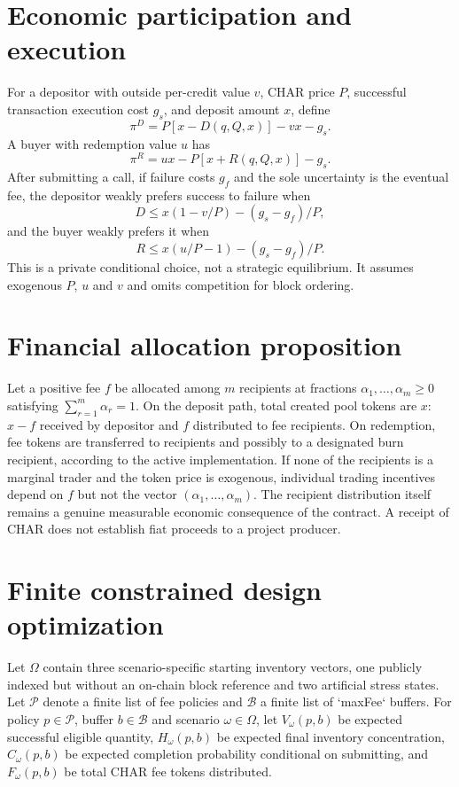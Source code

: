 \documentclass[11pt]{article}
\begin{document}
\section{Economic participation and execution}
For a depositor with outside per-credit value $v$, CHAR price $P$, successful transaction execution cost $g_s$, and deposit amount $x$, define
\begin{equation}
\pi^D=P[x-D(q,Q,x)]-vx-g_s.
\end{equation}
A buyer with redemption value $u$ has
\begin{equation}
\pi^R=ux-P[x+R(q,Q,x)]-g_s.
\end{equation}
After submitting a call, if failure costs $g_f$ and the sole uncertainty is the eventual fee, the depositor weakly prefers success to failure when
\begin{equation}
D\le x(1-v/P)-(g_s-g_f)/P,
\end{equation}
and the buyer weakly prefers it when
\begin{equation}
R\le x(u/P-1)-(g_s-g_f)/P.
\end{equation}
This is a private conditional choice, not a strategic equilibrium. It assumes exogenous $P$, $u$ and $v$ and omits competition for block ordering.

\section{Financial allocation proposition}
Let a positive fee $f$ be allocated among $m$ recipients at fractions $\alpha_1,\dots,\alpha_m\ge0$ satisfying $\sum_{r=1}^m\alpha_r=1$. On the deposit path, total created pool tokens are $x$: $x-f$ received by depositor and $f$ distributed to fee recipients. On redemption, fee tokens are transferred to recipients and possibly to a designated burn recipient, according to the active implementation. If none of the recipients is a marginal trader and the token price is exogenous, individual trading incentives depend on $f$ but not the vector $(\alpha_1,\dots,\alpha_m)$. The recipient distribution itself remains a genuine measurable economic consequence of the contract. A receipt of CHAR does not establish fiat proceeds to a project producer.

\section{Finite constrained design optimization}
Let $\Omega$ contain three scenario-specific starting inventory vectors, one publicly indexed but without an on-chain block reference and two artificial stress states. Let $\mathcal{P}$ denote a finite list of fee policies and $\mathcal{B}$ a finite list of `maxFee` buffers. For policy $p\in\mathcal{P}$, buffer $b\in\mathcal{B}$ and scenario $\omega\in\Omega$, let $V_\omega(p,b)$ be expected successful eligible quantity, $H_\omega(p,b)$ be expected final inventory concentration, $C_\omega(p,b)$ be expected completion probability conditional on submitting, and $F_\omega(p,b)$ be total CHAR fee tokens distributed.
\end{document}
